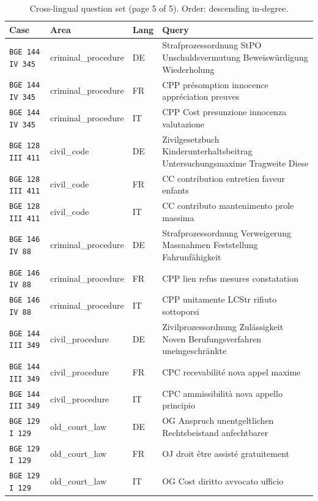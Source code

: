 \begin{table}[h]
\centering
\caption{Cross-lingual question set (page 5 of 5). Order: descending in-degree.}
\scriptsize
\setlength{\tabcolsep}{2pt}
\begin{tabular}{>{\raggedright\arraybackslash}p{2.2cm} >{\raggedright\arraybackslash}p{3.55cm} >{\raggedright\arraybackslash}p{0.8cm} >{\raggedright\arraybackslash}p{8.05cm}}
\toprule
\textbf{Case} & \textbf{Area} & \textbf{Lang} & \textbf{Query} \\
\midrule
\texttt{BGE 144 IV 345} & criminal\_procedure & DE & Strafprozessordnung StPO Unschuldsvermutung Beweiswürdigung Wiederholung \\
\texttt{BGE 144 IV 345} & criminal\_procedure & FR & CPP présomption innocence appréciation preuves \\
\texttt{BGE 144 IV 345} & criminal\_procedure & IT & CPP Cost presunzione innocenza valutazione \\
\texttt{BGE 128 III 411} & civil\_code & DE & Zivilgesetzbuch Kinderunterhaltsbeitrag Untersuchungsmaxime Tragweite Diese \\
\texttt{BGE 128 III 411} & civil\_code & FR & CC contribution entretien faveur enfants \\
\texttt{BGE 128 III 411} & civil\_code & IT & CC contributo mantenimento prole massima \\
\texttt{BGE 146 IV 88} & criminal\_procedure & DE & Strafprozessordnung Verweigerung Massnahmen Feststellung Fahrunfähigkeit \\
\texttt{BGE 146 IV 88} & criminal\_procedure & FR & CPP lien refus mesures constatation \\
\texttt{BGE 146 IV 88} & criminal\_procedure & IT & CPP unitamente LCStr rifiuto sottoporsi \\
\texttt{BGE 144 III 349} & civil\_procedure & DE & Zivilprozessordnung Zulässigkeit Noven Berufungsverfahren uneingeschränkte \\
\texttt{BGE 144 III 349} & civil\_procedure & FR & CPC recevabilité nova appel maxime \\
\texttt{BGE 144 III 349} & civil\_procedure & IT & CPC ammissibilità nova appello principio \\
\texttt{BGE 129 I 129} & old\_court\_law & DE & OG Anspruch unentgeltlichen Rechtsbeistand anfechtbarer \\
\texttt{BGE 129 I 129} & old\_court\_law & FR & OJ droit être assisté gratuitement \\
\texttt{BGE 129 I 129} & old\_court\_law & IT & OG Cost diritto avvocato ufficio \\

\end{tabular}
\end{table}
